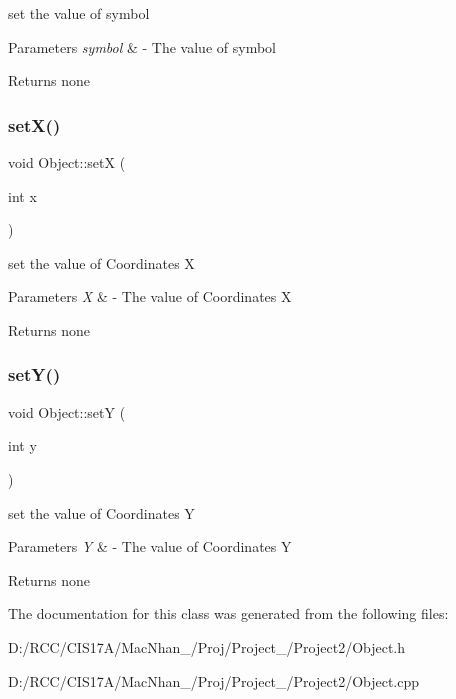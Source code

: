 set the value of symbol 


\begin{DoxyParams}{Parameters}
{\em symbol} & -\/ The value of symbol \\
\hline
\end{DoxyParams}
\begin{DoxyReturn}{Returns}
none 
\end{DoxyReturn}
\mbox{\label{class_object_ad62efaa642d05c8b54b4427c23803398}} 
\subsubsection{\texorpdfstring{set\+X()}{setX()}}
{\footnotesize\ttfamily void Object\+::setX (\begin{DoxyParamCaption}\item[{int}]{x }\end{DoxyParamCaption})}



set the value of Coordinates X 


\begin{DoxyParams}{Parameters}
{\em X} & -\/ The value of Coordinates X \\
\hline
\end{DoxyParams}
\begin{DoxyReturn}{Returns}
none 
\end{DoxyReturn}
\mbox{\label{class_object_a9b3c3653717b0540dfa783bf666abf63}} 
\subsubsection{\texorpdfstring{set\+Y()}{setY()}}
{\footnotesize\ttfamily void Object\+::setY (\begin{DoxyParamCaption}\item[{int}]{y }\end{DoxyParamCaption})}



set the value of Coordinates Y 


\begin{DoxyParams}{Parameters}
{\em Y} & -\/ The value of Coordinates Y \\
\hline
\end{DoxyParams}
\begin{DoxyReturn}{Returns}
none 
\end{DoxyReturn}


The documentation for this class was generated from the following files\+:\begin{DoxyCompactItemize}
\item 
D\+:/\+R\+C\+C/\+C\+I\+S17\+A/\+Mac\+Nhan\+\_/\+Proj/\+Project\+\_/\+Project2/Object.\+h\item 
D\+:/\+R\+C\+C/\+C\+I\+S17\+A/\+Mac\+Nhan\+\_/\+Proj/\+Project\+\_/\+Project2/Object.\+cpp\end{DoxyCompactItemize}
